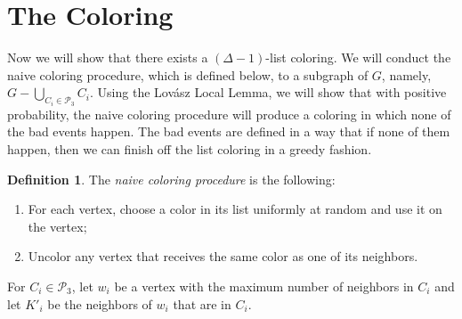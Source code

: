 \documentclass[12pt]{article}
\theoremstyle{definition}
\newtheorem{definition}[theorem]{Definition}
\begin{document}
\section{The Coloring}

Now we will show that there exists a $(\Delta-1)$-list coloring.
We will conduct the naive coloring procedure, which is defined below, to a subgraph of $G$, namely, $G-\bigcup_{C_i\in \mathcal{P}_3}C_i$.
Using the Lov\'asz Local Lemma, we will show that with positive probability, the naive coloring procedure will produce a coloring in which none of the bad events happen. 
The bad events are defined in a way that if none of them happen, then we can finish off the list coloring in a greedy fashion. 

\begin{definition}
The {\it naive coloring procedure} is the following:
\begin{enumerate}[$(i)$]
\item For each vertex, choose a color in its list uniformly at random and use it on the vertex;
\item Uncolor any vertex that receives the same color as one of its neighbors.
\end{enumerate}
\end{definition}

For $C_i\in \mathcal{P}_3$, let $w_i$ be a vertex with the maximum number of neighbors in $C_i$ and let $K'_i$ be the neighbors of $w_i$ that are in $C_i$. 
\end{document}

